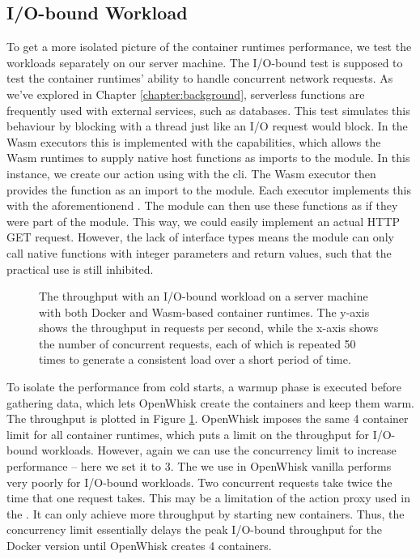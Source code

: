 \subsection{I/O-bound Workload}

To get a more isolated picture of the container runtimes performance, we test the workloads separately on our server machine. The I/O-bound test is supposed to test the container runtimes' ability to handle concurrent network requests. As we've explored in Chapter \ref{chapter:background}, serverless functions are frequently used with external services, such as databases. This test simulates this behaviour by blocking with a thread  just like an I/O request would block. In the Wasm executors this is implemented with the capabilities, which allows the Wasm runtimes to supply native host functions as imports to the module. In this instance, we create our action using  with the  cli. The Wasm executor then provides the  function as an import to the module. Each executor implements this with the aforementionend . The module can then use these functions as if they were part of the module. This way, we could easily implement an actual HTTP GET request. However, the lack of interface types means the module can only call native functions with integer parameters and return values, such that the practical use is still inhibited.

\begin{figure}
    \begin{center}
        
    \end{center}
    \caption{The throughput with an I/O-bound workload on a server machine with both Docker and Wasm-based container runtimes. The y-axis shows the throughput in requests per second, while the x-axis shows the number of concurrent requests, each of which is repeated 50 times to generate a consistent load over a short period of time.}
    \label{fig:pc-load-block}
\end{figure}

To isolate the performance from cold starts, a warmup phase is executed before gathering data, which lets OpenWhisk create the containers and keep them warm. The throughput is plotted in Figure \ref{fig:pc-load-block}. OpenWhisk imposes the same 4 container limit for all container runtimes, which puts a limit on the throughput for I/O-bound workloads. However, again we can use the concurrency limit to increase performance -- here we set it to 3. The  we use in OpenWhisk vanilla performs very poorly for I/O-bound workloads. Two concurrent requests take twice the time that one request takes. This may be a limitation of the action proxy used in the .
It can only achieve more throughput by starting new containers. Thus, the concurrency limit essentially delays the peak I/O-bound throughput for the Docker version until OpenWhisk creates 4 containers.

